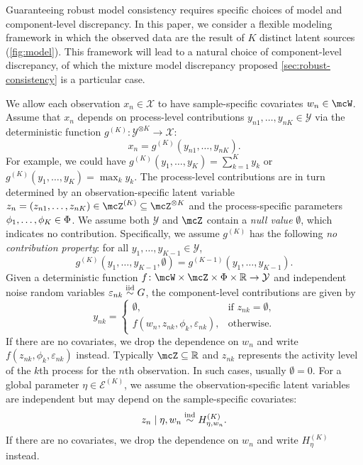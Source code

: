 Guaranteeing robust model consistency requires specific choices of model and component-level discrepancy.
In this paper, we consider a flexible modeling framework in which the observed data are the result of $K$ distinct latent sources (\cref{fig:model}). 
This framework will lead to a natural choice of component-level discrepancy, of which the mixture model
discrepancy proposed \cref{sec:robust-consistency} is a particular case. 

We allow each observation $x_n \in \mathcal{X}$ to have sample-specific covariates $w_n \in \mcW$.
Assume that $x_n$ depends on process-level contributions $y_{n1},\dots,y_{nK} \in \mathcal{Y}$ via the deterministic function $g^{(K)} \colon \mathcal{Y}^{\otimes K} \to \mathcal{X}$:
\[
	x_n = g^{(K)}(y_{n1}, \dots, y_{nK}).
\]
For example, we could have $g^{(K)}(y_1,\dots,y_K) = \sum_{k=1}^K y_k$ or $g^{(K)}(y_1,\dots,y_K) = \max_{k} y_{k}$.
The process-level contributions are in turn
determined by an observation-specific latent variable $z_n  = (z_{n1},\dots,z_{nK}) \in \mcZ^{(K)} \subseteq \mcZ^{\otimes K}$ and the process-specific parameters $\phi_1,\dots,\phi_K \in \Phi$.
We assume both $\mathcal{Y}$ and $\mcZ$ contain a \emph{null value} $\emptyset$, which indicates no contribution.
Specifically, we assume $g^{(K)}$ has the following \emph{no contribution property}: for all $y_1,\dots,y_{K-1} \in \mathcal{Y}$,
\[
	g^{(K)}(y_{1}, \dots, y_{K-1}, \emptyset) = g^{(K-1)}(y_{1}, \dots, y_{K-1}).
\]
Given a deterministic function
$f \colon \mcW \times \mcZ \times \Phi \times \reals \to \mathcal{Y}$
and independent noise random variables
$
	\varepsilon_{nk} \stackrel{\text{iid}}{\sim} G
$,
the component-level contributions are given by
\[
	y_{nk} = \begin{cases}
		\emptyset,                                  & \text{if $z_{nk} = \emptyset$,} \\
		f(w_{n}, z_{nk}, \phi_k, \varepsilon_{nk}), & \text{otherwise}.
	\end{cases}
\]
If there are no covariates, we drop the dependence on $w_n$ and write $f(z_{nk}, \phi_k, \varepsilon_{nk})$ instead.
Typically $\mcZ \subseteq \reals$ and $z_{nk}$ represents the activity level of the $k$th process for the $n$th observation.
In such cases, usually $\emptyset = 0$.
For a global parameter $\eta \in \mathcal{E}^{(K)}$, we assume the observation-specific latent variables are independent but may depend on the sample-specific covariates:
\[
	z_n \mid \eta, w_n \stackrel{\text{ind}}{\sim} H^{(K)}_{\eta,w_n}.
\]
If there are no covariates, we drop the dependence on $w_{n}$ and write $H^{(K)}_{\eta}$ instead.

